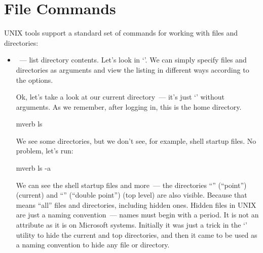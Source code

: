 \section*{File Commands}

UNIX tools support a standard set of commands for working with files and
directories:
\begin{itemize}
\item {}~--- list directory contents. Let's look in `'.
      We can simply specify files and directories as arguments and view
      the listing in different ways according to the options.

      Ok, let's take a look at our current directory~--- it's just
      `' without arguments. As we remember, after logging in,
      this is the home directory.
\begin{code}{mverb}
ls
\end{code}
We see some directories, but we don't see, for example, shell startup
files. No problem, let's run:
\begin{code}{mverb}
ls -a
\end{code}
We can see the shell startup files and more~--- the directories ``'' (``point'')
(current) and ``'' (``double point'') (top level) are also visible.
Because that means ``all'' files and directories, including hidden ones.
Hidden files in UNIX are just a naming convention~--- names must begin with
a period. It is not an attribute as it is on Microsoft systems. Initially
it was just a trick in the `' utility to hide the current and top
directories, and then it came to be used as a naming convention to hide
any file or directory.


\end{itemize}
